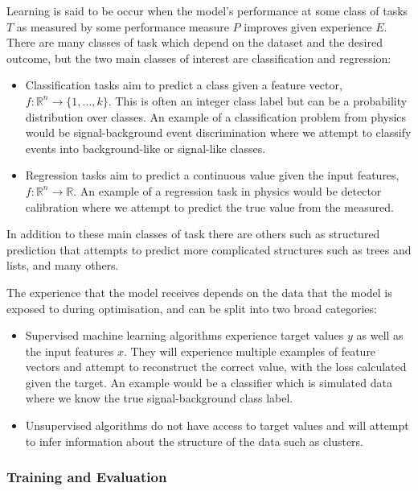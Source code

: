 Learning is said to be occur when the model's performance at some class of tasks $T$ as measured by some performance measure $P$ improves given experience $E$. 
There are many classes of task which depend on the dataset and the desired outcome, but the two main classes of interest are classification and regression:
\begin{itemize}[leftmargin=.5in,noitemsep]
    \item Classification tasks aim to predict a class given a feature vector, $f:\mathds{R}^{n}\rightarrow{}\{1,\dots,k\}$.
This is often an integer class label but can be a probability distribution over classes. An example of a classification problem from physics would be signal-background event discrimination where we attempt to classify events into background-like or signal-like classes.
    \item Regression tasks aim to predict a continuous value given the input features, $f:\mathds{R}^{n}\rightarrow\mathds{R}$. An example of a regression task in physics would be detector calibration where we attempt to predict the true value from the measured. 
\end{itemize}
In addition to these main classes of task there are others such as structured prediction that attempts to predict more complicated structures such as trees and lists, and many others. 


The experience that the model receives depends on the data that the model is exposed to during optimisation, and can be split into two broad categories:
\begin{itemize}[leftmargin=.5in,noitemsep]
    \item Supervised machine learning algorithms experience target values $y$ as well as the input features $x$. They will experience multiple examples of feature vectors and attempt to reconstruct the correct value, with the loss calculated given the target. An example would be a classifier which is simulated data where we know the true signal-background class label. 
    \item Unsupervised algorithms do not have access to target values and will attempt to infer information about the structure of the data such as clusters.
\end{itemize}



\subsubsection{Training and Evaluation}

